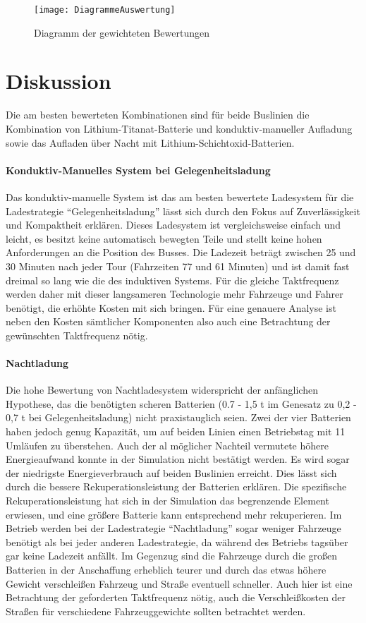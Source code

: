 \begin{figure}\centering
	\texttt{[image: DiagrammeAuswertung]}
	\caption{Diagramm der gewichteten Bewertungen}
	\label{abb_DiagrammAuswertung}
\end{figure}

\section{Diskussion}
Die am besten bewerteten Kombinationen sind für beide Buslinien die Kombination von Lithium-Titanat-Batterie und konduktiv-manueller Aufladung sowie das Aufladen über Nacht mit Lithium-Schichtoxid-Batterien.

\paragraph{Konduktiv-Manuelles System bei Gelegenheitsladung} Das konduktiv-manuelle System ist das am besten bewertete Ladesystem für die Ladestrategie "`Gelegenheitsladung"' lässt sich durch den Fokus auf Zuverlässigkeit und Kompaktheit erklären. Dieses Ladesystem ist vergleichsweise einfach und leicht, es besitzt keine automatisch bewegten Teile und stellt keine hohen Anforderungen an die Position des Busses. Die Ladezeit beträgt zwischen 25 und 30 Minuten nach jeder Tour (Fahrzeiten 77 und 61 Minuten) und ist damit fast dreimal so lang wie die des induktiven Systems. Für die gleiche Taktfrequenz werden daher mit dieser langsameren Technologie mehr Fahrzeuge und Fahrer benötigt, die erhöhte Kosten mit sich bringen. Für eine genauere Analyse ist neben den Kosten sämtlicher Komponenten also auch eine Betrachtung der gewünschten Taktfrequenz nötig.

\paragraph{Nachtladung} Die hohe Bewertung von Nachtladesystem widerspricht der anfänglichen Hypothese, das die benötigten scheren Batterien (0.7 - 1,5 t im Genesatz zu 0,2 - 0,7 t bei Gelegenheitsladung) nicht praxistauglich seien. Zwei der vier Batterien haben jedoch genug Kapazität, um auf beiden Linien einen Betriebstag mit 11 Umläufen zu überstehen. Auch der al möglicher Nachteil vermutete höhere Energieaufwand konnte in der Simulation nicht bestätigt werden. Es wird sogar der niedrigste Energieverbrauch auf beiden Buslinien erreicht. Dies lässt sich durch die bessere Rekuperationsleistung der Batterien erklären. Die spezifische Rekuperationsleistung hat sich in der Simulation das begrenzende Element erwiesen, und eine größere Batterie kann entsprechend mehr rekuperieren. Im Betrieb werden bei der Ladestrategie "`Nachtladung"' sogar weniger Fahrzeuge benötigt als bei jeder anderen Ladestrategie, da während des Betriebs tagsüber gar keine Ladezeit anfällt. Im Gegenzug sind die Fahrzeuge durch die großen Batterien in der Anschaffung erheblich teurer und durch das etwas höhere Gewicht verschleißen Fahrzeug und Straße eventuell schneller. Auch hier ist eine Betrachtung der geforderten Taktfrequenz nötig, auch die Verschleißkosten der Straßen für verschiedene Fahrzeuggewichte sollten betrachtet werden.

